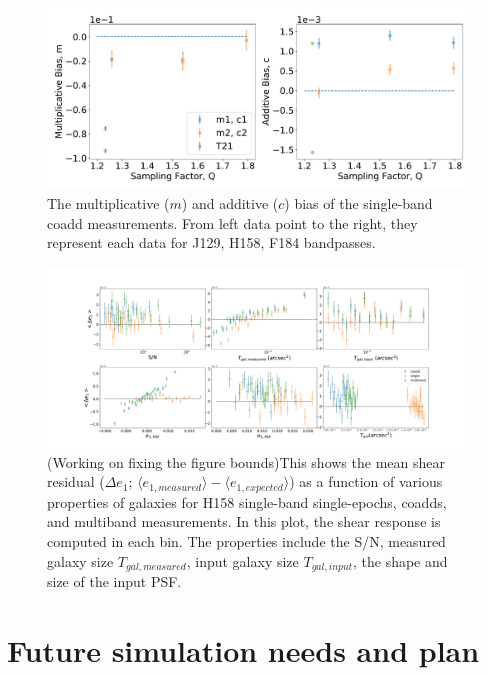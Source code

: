 \documentclass[fleqn,usenatbib]{mnras}
\begin{document}
\begin{figure}
	\includegraphics[width=\textwidth]{final_result.pdf}
    \caption{The multiplicative ($m$) and additive ($c$) bias of the single-band coadd measurements. From left data point to the right, they represent each data for J129, H158, F184 bandpasses. }
    \label{fig:final_result}
\end{figure}

\begin{figure}
    \hspace*{-3.5cm}
    \centering
	\includegraphics[scale=0.34]{H158_meanshear_measured_properties_perbin_e1_v2.pdf}
    \caption{(Working on fixing the figure bounds)This shows the mean shear residual ($\Delta e_{1}$; $\langle e_{1,measured} \rangle - \langle e_{1,expected} \rangle$) as a function of various properties of galaxies for H158 single-band single-epochs, coadds, and multiband measurements. In this plot, the shear response is computed in each bin. The properties include the S/N, measured galaxy size $T_{gal,measured}$, input galaxy size $T_{gal,input}$, the shape and size of the input PSF.}
    \label{fig:meanshear}
\end{figure}


\section{Future simulation needs and plan}
\label{sec:discussion}
\end{document}
